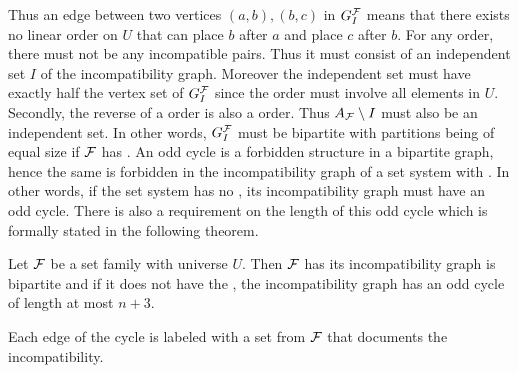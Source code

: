 Thus an edge between two vertices $(a,b), (b,c)$ in $G_I^{{\cal F}}$ means
that there exists no linear order on $U$ that can place $b$ after $a$
and place $c$ after $b$.  For any \COP order, there must not be any
incompatible pairs. Thus it must consist of an independent set $I$ of
the incompatibility graph. Moreover the independent set must have
exactly half the vertex set of $G_I^{\cal F}$ since the \COP order must
involve all elements in $U$. Secondly, the reverse of a \COP order is
also a \COP order. Thus $A_{\cal F} \setminus I$ must also be an
independent set. In other words, $G_I^{\cal F}$ must be bipartite with
partitions being of equal size if ${\cal F}$ has \COP. An odd cycle is a
forbidden structure in a bipartite graph, hence the same is forbidden
in the incompatibility graph of a set system with \COP. In other
words, if the set system has no \COP, its incompatibility graph must
have an odd cycle.  There is also a requirement on the length of this
odd cycle which is formally stated in the following
theorem. 

\begin{theoremsansproof} 
  Let ${\cal F}$ be a set family with universe $U$. Then ${\cal F}$ has \COP
  \iff its incompatibility graph is bipartite and if it does not have
  the \COP, the incompatibility graph has an odd cycle of length at
  most $n+3$.
\end{theoremsansproof}


Each edge of the cycle is labeled with a set from ${\cal F}$ that documents
the incompatibility.













